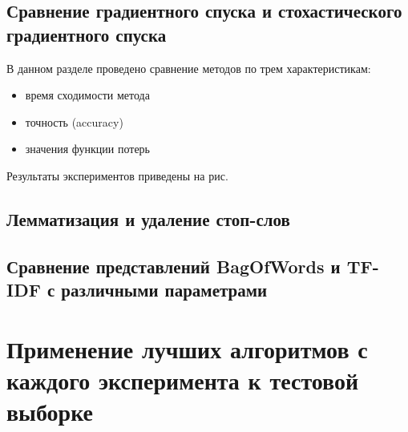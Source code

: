\documentclass[a4paper, 11pt]{article}
\begin{document}
        \subsection{Сравнение градиентного спуска и стохастического градиентного спуска}
            В данном разделе проведено сравнение методов по трем характеристикам:
            \begin{itemize}
                \item время сходимости метода
                \item точность (accuracy)
                \item значения функции потерь
            \end{itemize}
           Результаты экспериментов приведены на рис. 
            
        \subsection{Лемматизация и удаление стоп-слов}
        
        \subsection{Сравнение представлений BagOfWords и TF-IDF с различными параметрами}
        
    \section{Применение лучших алгоритмов с каждого эксперимента к тестовой выборке}
    
       
        
        
            
\end{document}
